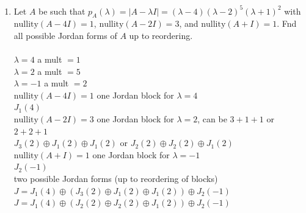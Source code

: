 \documentclass{article}
\begin{document}
{{\begin{enumerate}
\begin{enumerate}[a.]
\\$e^{At}=P(e^{-4t}\left[\begin{array}{cc} 1 & t \\ 0 & 1 \end{array}\right])P^{-1}=e^{-4t}P\left[\begin{array}{cc} 1 & t \\ 0 & 1 \end{array}\right]P^{-1}$
\\$e^{At}=e^{-4t}\left[\begin{array}{cc} 1+t & -t \\ t & 1-t \end{array}\right]$
\\$x(t)=e^{At}x(0)=e^{-4t}\left[\begin{array}{cc} 1+t & -t \\ t & 1-t \end{array}\right]\left[\begin{array}{c} 1 \\ 2 \end{array}\right]=e^{-4t}\left[\begin{array}{c} 1+t-2t \\ t+2(1-t) \end{array}\right]=e^{-4t}\left[\begin{array}{c} 1-t \\ 2-t \end{array}\right]$
\\$x_1(t)=(1-t)e^{-4t}$
\\$x_2(t)=(2-t)e^{-4t}$
\end{enumerate}


\newpage\item Let $A$ be such that $p_A(\lambda)=|A-\lambda I|=(\lambda-4)(\lambda-2)^5(\lambda+1)^2$ with $\textrm{nullity}(A-4I)=1$, $\textrm{nullity}(A-2I)=3$, and $\textrm{nullity}(A+I)=1$. Fnd all possible Jordan forms of $A$ up to reordering.
\\
\\$\lambda=4$ a mult $=1$
\\$\lambda=2$ a mult $=5$
\\$\lambda=-1$ a mult $=2$
\\$\textrm{nullity}(A-4I)=1$ one Jordan block for $\lambda=4$
\\$J_1(4)$
\\$\textrm{nullity}(A-2I)=3$ one Jordan block for $\lambda=2$, can be $3+1+1$ or $2+2+1$
\\$J_3(2)\oplus J_1(2) \oplus J_1(2)$ or $J_2(2)\oplus J_2(2) \oplus J_1(2)$
\\$\textrm{nullity}(A+I)=1$ one Jordan block for $\lambda=-1$
\\$J_2(-1)$
\\two possible Jordan forms (up to reordering of blocks)
\\$J=J_1(4) \oplus (J_3(2)\oplus J_1(2) \oplus J_1(2)) \oplus J_2(-1)$
\\$J=J_1(4) \oplus (J_2(2)\oplus J_2(2) \oplus J_1(2)) \oplus J_2(-1)$


\end{enumerate}}}
\end{document}
